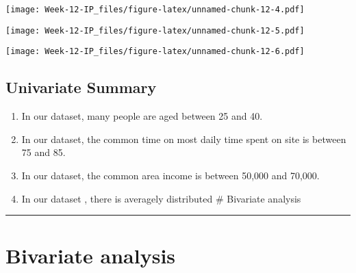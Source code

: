 \documentclass[
]{article}
\newenvironment{Shaded}{\begin{snugshade}}{\end{snugshade}}
\newcommand{\AttributeTok}[1]{\textcolor[rgb]{0.77,0.63,0.00}{#1}}
\newcommand{\FunctionTok}[1]{\textcolor[rgb]{0.00,0.00,0.00}{#1}}
\newcommand{\NormalTok}[1]{#1}
\newcommand{\SpecialCharTok}[1]{\textcolor[rgb]{0.00,0.00,0.00}{#1}}
\newcommand{\StringTok}[1]{\textcolor[rgb]{0.31,0.60,0.02}{#1}}
\providecommand{\tightlist}{%
  \setlength{\itemsep}{0pt}\setlength{\parskip}{0pt}}
\begin{document}
\texttt{[image: Week-12-IP\_files/figure-latex/unnamed-chunk-12-4.pdf]}

\begin{Shaded}
\end{Shaded}

\texttt{[image: Week-12-IP\_files/figure-latex/unnamed-chunk-12-5.pdf]}

\begin{Shaded}
\end{Shaded}

\texttt{[image: Week-12-IP\_files/figure-latex/unnamed-chunk-12-6.pdf]}

\hypertarget{univariate-summary}{%
\subsection{Univariate Summary}\label{univariate-summary}}

\begin{enumerate}
\def\labelenumi{\arabic{enumi}.}
\tightlist
\item
  In our dataset, many people are aged between 25 and 40.
\item
  In our dataset, the common time on most daily time spent on site is
  between 75 and 85.
\item
  In our dataset, the common area income is between 50,000 and 70,000.
\item
  In our dataset , there is averagely distributed \# Bivariate analysis
\end{enumerate}

\begin{center}\rule{0.5\linewidth}{0.5pt}\end{center}

\hypertarget{bivariate-analysis}{%
\section{Bivariate analysis}\label{bivariate-analysis}}
\end{document}
